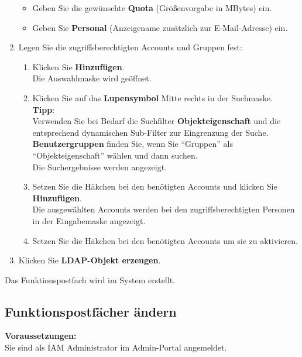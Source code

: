 \documentclass[
  letterpaper,
  DIV=11,
  numbers=noendperiod]{scrreprt}
\providecommand{\tightlist}{%
  \setlength{\itemsep}{0pt}\setlength{\parskip}{0pt}}\usepackage{longtable,booktabs,array}
\begin{document}
\begin{enumerate}
  \begin{itemize}
  \tightlist
  \item
    Geben Sie die gewünschte \textbf{Quota} (Größenvorgabe in MBytes)
    ein.
  \item
    Geben Sie \textbf{Personal} (Anzeigename zusätzlich zur
    E-Mail-Adresse) ein.\\
  \end{itemize}
\item
  Legen Sie die zugriffsberechtigten Accounts und Gruppen fest:

  \begin{enumerate}
  \def\labelenumii{\arabic{enumii}.}
  \tightlist
  \item
    Klicken Sie \textbf{Hinzufügen}.\\
    Die Auswahlmaske wird geöffnet.
  \item
    Klicken Sie auf das \textbf{Lupensymbol} Mitte rechts in der
    Suchmaske.\\
    \textbf{Tipp}:\\
    Verwenden Sie bei Bedarf die Suchfilter \textbf{Objekteigenschaft}
    und die entsprechend dynamischen Sub-Filter zur Eingrenzung der
    Suche.\\
    \textbf{Benutzergruppen} finden Sie, wenn Sie ``Gruppen'' als
    ``Objekteigenschaft'' wählen und dann suchen.\\
    Die Suchergebnisse werden angezeigt.
  \item
    Setzen Sie die Häkchen bei den benötigten Accounts und klicken Sie
    \textbf{Hinzufügen}.\\
    Die ausgewählten Accounts werden bei den zugriffsberechtigten
    Personen in der Eingabemaske angezeigt.
  \item
    Setzen Sie die Häkchen bei den benötigten Accounts um sie zu
    aktivieren.
  \end{enumerate}
\item
  Klicken Sie \textbf{LDAP-Objekt erzeugen}.
\end{enumerate}

Das Funktionspostfach wird im System erstellt.

\subsection{Funktionspostfächer
ändern}\label{funktionspostfuxe4cher-uxe4ndern}

\textbf{Voraussetzungen:}\\
Sie sind als IAM Administrator im Admin-Portal angemeldet.
\end{document}
